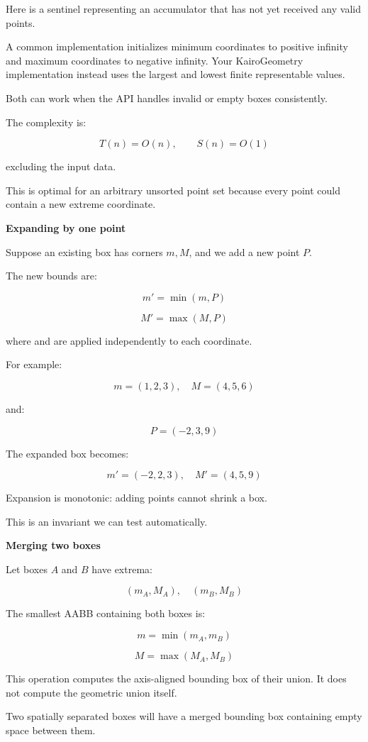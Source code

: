 Here  is a sentinel representing an accumulator that has not yet received any valid points.

A common implementation initializes minimum coordinates to positive infinity and maximum coordinates to negative infinity. Your KairoGeometry implementation instead uses the largest and lowest finite representable values.

Both can work when the API handles invalid or empty boxes consistently.

The complexity is:

\[
T(n)=O(n),\qquad S(n)=O(1)
\]

excluding the input data.

This is optimal for an arbitrary unsorted point set because every point could contain a new extreme coordinate.

\textbf{Expanding by one point}

Suppose an existing box has corners \(m,M\), and we add a new point \(P\).

The new bounds are:

\[
m'=\min(m,P)
\]

\[
M'=\max(M,P)
\]

where  and  are applied independently to each coordinate.

For example:

\[
m=(1,2,3),\quad M=(4,5,6)
\]

and:

\[
P=(-2,3,9)
\]

The expanded box becomes:

\[
m'=(-2,2,3),\quad M'=(4,5,9)
\]

Expansion is monotonic: adding points cannot shrink a box.

This is an invariant we can test automatically.

\textbf{Merging two boxes}

Let boxes \(A\) and \(B\) have extrema:

\[
(m_A,M_A),\quad(m_B,M_B)
\]

The smallest AABB containing both boxes is:

\[
\boxed{ m=\min(m_A,m_B) }
\]

\[
\boxed{ M=\max(M_A,M_B) }
\]

This operation computes the axis-aligned bounding box of their union. It does not compute the geometric union itself.

Two spatially separated boxes will have a merged bounding box containing empty space between them.

